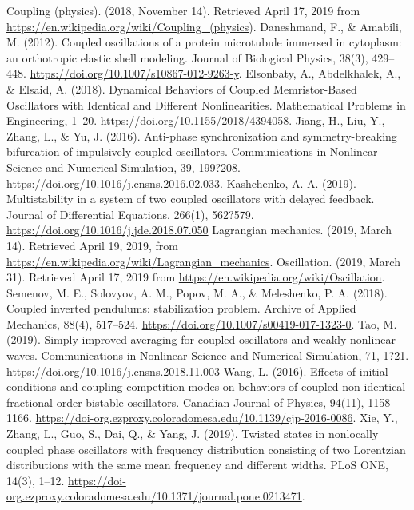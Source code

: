 \documentclass[twocolumn]{article}
\begin{document}
\begin{thebibliography}{99}
Coupling (physics). (2018, November 14). Retrieved April 17, 2019 from \url{https://en.wikipedia.org/wiki/Coupling_(physics)}.
Daneshmand, F., \& Amabili, M. (2012). Coupled oscillations of a protein microtubule immersed in cytoplasm: an orthotropic elastic shell modeling. Journal of Biological Physics, 38(3), 429–448. \url{https://doi.org/10.1007/s10867-012-9263-y}.
Elsonbaty, A., Abdelkhalek, A., \& Elsaid, A. (2018). Dynamical Behaviors of Coupled Memristor-Based Oscillators with Identical and Different Nonlinearities. Mathematical Problems in Engineering, 1–20. \url{https://doi.org/10.1155/2018/4394058}.
Jiang, H., Liu, Y., Zhang, L., \& Yu, J. (2016). Anti-phase synchronization and symmetry-breaking bifurcation of impulsively coupled oscillators. Communications in Nonlinear Science and Numerical Simulation, 39, 199?208. \url{https://doi.org/10.1016/j.cnsns.2016.02.033}.
Kashchenko, A. A. (2019). Multistability in a system of two coupled oscillators with delayed feedback. Journal of Differential Equations, 266(1), 562?579. \url{https://doi.org/10.1016/j.jde.2018.07.050}
Lagrangian mechanics. (2019, March 14). Retrieved April 19, 2019, from \url{https://en.wikipedia.org/wiki/Lagrangian_mechanics}.
Oscillation. (2019, March 31). Retrieved April 17, 2019 from \url{https://en.wikipedia.org/wiki/Oscillation}.
Semenov, M. E., Solovyov, A. M., Popov, M. A., \& Meleshenko, P. A. (2018). Coupled inverted pendulums: stabilization problem. Archive of Applied Mechanics, 88(4), 517–524. \url{https://doi.org/10.1007/s00419-017-1323-0}.
Tao, M. (2019). Simply improved averaging for coupled oscillators and weakly nonlinear waves. Communications in Nonlinear Science and Numerical Simulation, 71, 1?21. \url{https://doi.org/10.1016/j.cnsns.2018.11.003}
Wang, L. (2016). Effects of initial conditions and coupling competition modes on behaviors of coupled non-identical fractional-order bistable oscillators. Canadian Journal of Physics, 94(11), 1158–1166. \url{https://doi-org.ezproxy.coloradomesa.edu/10.1139/cjp-2016-0086}.
Xie, Y., Zhang, L., Guo, S., Dai, Q., \& Yang, J. (2019). Twisted states in nonlocally coupled phase oscillators with frequency distribution consisting of two Lorentzian distributions with the same mean frequency and different widths. PLoS ONE, 14(3), 1–12. \url{https://doi-org.ezproxy.coloradomesa.edu/10.1371/journal.pone.0213471}.
\end{thebibliography}
\end{document}
